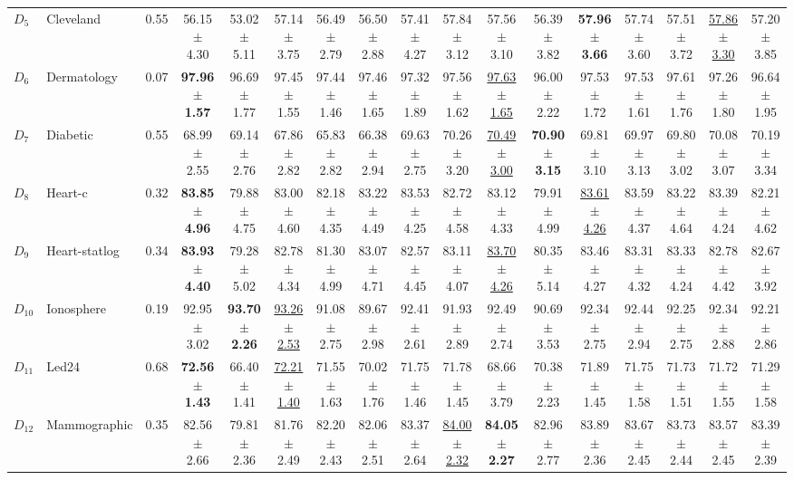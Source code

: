 {\begin{landscape}
\begin{table}[!ht]
\begin{adjustbox}{max width=1.5\textwidth}
\begin{tabular}{llccccccccccccccc}
  $D_5$ & Cleveland & 0.55 &56.15 $\pm$ 4.30 & 53.02 $\pm$ 5.11 & 57.14 $\pm$ 3.75 & 56.49 $\pm$  2.79 & 56.50 $\pm$ 2.88 &57.41 $\pm$ 4.27 & 57.84 $\pm$ 3.12 & 57.56 $\pm$ 3.10 & 56.39 $\pm$ 3.82 &\textbf{57.96 $\pm$ 3.66}  & 57.74 $\pm$ 3.60 & 57.51 $\pm$ 3.72 & \underline{57.86 $\pm$ 3.30} & 57.20 $\pm$ 3.85 \\ 
  $D_6$ & Dermatology & 0.07 &\textbf{97.96 $\pm$ 1.57} & 96.69 $\pm$ 1.77 & 97.45 $\pm$ 1.55 & 97.44 $\pm$ 1.46 & 97.46 $\pm$ 1.65 & 97.32 $\pm$ 1.89 & 97.56 $\pm$ 1.62 & \underline{97.63 $\pm$ 1.65} & 96.00 $\pm$ 2.22 & 97.53 $\pm$ 1.72& 97.53 $\pm$ 1.61 & 97.61 $\pm$ 1.76 & 97.26 $\pm$ 1.80 & 96.64 $\pm$ 1.95 \\ 
  $D_7$ & Diabetic & 0.55 &68.99 $\pm$ 2.55 & 69.14 $\pm$ 2.76 & 67.86 $\pm$ 2.82 & 65.83 $\pm$ 2.82 & 66.38 $\pm$ 2.94 & 69.63 $\pm$ 2.75  & 70.26 $\pm$ 3.20 &\underline{70.49 $\pm$ 3.00}&\textbf{ 70.90 $\pm$ 3.15} & 69.81 $\pm$ 3.10 & 69.97 $\pm$ 3.13 & 69.80 $\pm$ 3.02 & 70.08 $\pm$ 3.07 & 70.19 $\pm$ 3.34 \\ 
  $D_8$ & Heart-c & 0.32 & \textbf{83.85 $\pm$ 4.96} & 79.88 $\pm$ 4.75 & 83.00 $\pm$ 4.60 & 82.18 $\pm$ 4.35  & 83.22 $\pm$ 4.49 & 83.53 $\pm$ 4.25 & 82.72 $\pm$ 4.58 & 83.12 $\pm$ 4.33 & 79.91 $\pm$ 4.99 & \underline{83.61 $\pm$ 4.26} & 83.59 $\pm$ 4.37 & 83.22 $\pm$ 4.64 & 83.39 $\pm$ 4.24 & 82.21 $\pm$ 4.62 \\ 
  $D_9$ & Heart-statlog & 0.34 & \textbf{83.93 $\pm$ 4.40}& 79.28 $\pm$ 5.02 & 82.78 $\pm$ 4.34 & 81.30 $\pm$ 4.99 & 83.07 $\pm$ 4.71 & 82.57 $\pm$ 4.45 & 83.11 $\pm$ 4.07 &\underline{83.70 $\pm$ 4.26}& 80.35 $\pm$ 5.14 & 83.46 $\pm$ 4.27 & 83.31 $\pm$ 4.32 & 83.33 $\pm$ 4.24 & 82.78 $\pm$  4.42 & 82.67 $\pm$ 3.92 \\ 
  $D_{10}$ & Ionosphere & 0.19 &92.95 $\pm$ 3.02& \textbf{93.70 $\pm$ 2.26} & \underline{93.26 $\pm$ 2.53} & 91.08 $\pm$ 2.75 & 89.67 $\pm$ 2.98 & 92.41 $\pm$ 2.61  & 91.93 $\pm$ 2.89 &92.49 $\pm$ 2.74& 90.69 $\pm$ 3.53 & 92.34 $\pm$ 2.75 & 92.44 $\pm$ 2.94 & 92.25 $\pm$ 2.75 & 92.34 $\pm$ 2.88 & 92.21 $\pm$ 2.86 \\ 
  $D_{11}$ & Led24 & 0.68 &\textbf{72.56 $\pm$ 1.43}& 66.40 $\pm$ 1.41 &\underline{72.21 $\pm$ 1.40} & 71.55 $\pm$ 1.63 & 70.02 $\pm$ 1.76 & 71.75 $\pm$ 1.46 & 71.78 $\pm$ 1.45 &68.66 $\pm$ 3.79& 70.38 $\pm$ 2.23 & 71.89 $\pm$ 1.45 & 71.75 $\pm$ 1.58 & 71.73 $\pm$ 1.51 & 71.72 $\pm$ 1.55 & 71.29 $\pm$ 1.58 \\ 
  $D_{12}$ & Mammographic & 0.35 &82.56 $\pm$ 2.66& 79.81 $\pm$ 2.36 & 81.76 $\pm$ 2.49 & 82.20 $\pm$ 2.43 & 82.06 $\pm$ 2.51 & 83.37 $\pm$ 2.64 & \underline{84.00 $\pm$ 2.32} &\textbf{84.05 $\pm$ 2.27}& 82.96 $\pm$ 2.77 & 83.89 $\pm$ 2.36 & 83.67 $\pm$ 2.45 & 83.73 $\pm$ 2.44 & 83.57 $\pm$ 2.45 & 83.39 $\pm$ 2.39 \\ 

\end{tabular}
\end{adjustbox}
\end{table}
\end{landscape}}
